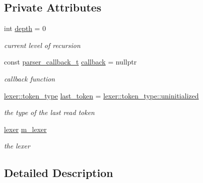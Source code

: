 \subsection*{Private Attributes}
\begin{DoxyCompactItemize}
\item 
int \hyperlink{classnlohmann_1_1basic__json_1_1parser_af10c872a9549a4d5aa3775ffdbb09e4c}{depth} = 0
\begin{DoxyCompactList}\small\item\em current level of recursion \end{DoxyCompactList}\item 
const \hyperlink{classnlohmann_1_1basic__json_aecae491e175f8767c550ae3c59e180e3}{parser\+\_\+callback\+\_\+t} \hyperlink{classnlohmann_1_1basic__json_1_1parser_a8ea1870aa64698f46b777e2863fde801}{callback} = nullptr
\begin{DoxyCompactList}\small\item\em callback function \end{DoxyCompactList}\item 
\hyperlink{classnlohmann_1_1basic__json_1_1lexer_a96887d6cd131e3d3a85a9d71fbdbcdf7}{lexer\+::token\+\_\+type} \hyperlink{classnlohmann_1_1basic__json_1_1parser_ace0babedd22742bbb5f31d35d1d5baa9}{last\+\_\+token} = \hyperlink{classnlohmann_1_1basic__json_1_1lexer_a96887d6cd131e3d3a85a9d71fbdbcdf7a42dd1a73d072bb6bf3f494f22b15db8e}{lexer\+::token\+\_\+type\+::uninitialized}
\begin{DoxyCompactList}\small\item\em the type of the last read token \end{DoxyCompactList}\item 
\hyperlink{classnlohmann_1_1basic__json_1_1lexer}{lexer} \hyperlink{classnlohmann_1_1basic__json_1_1parser_a8419745c712b365ccf3d87abc7586e08}{m\+\_\+lexer}
\begin{DoxyCompactList}\small\item\em the lexer \end{DoxyCompactList}\end{DoxyCompactItemize}


\subsection{Detailed Description}
